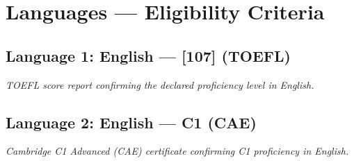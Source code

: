 \documentclass[12pt,a4paper]{article}
\newcommand{\insertdoc}[2]{%
  \begin{tcolorbox}[placeholderbox, title={$\Rightarrow$ #1}]
    \small\textit{#2}
  \end{tcolorbox}
  \vspace{4pt}
}
\begin{document}
\newpage
 
\section{Languages — Eligibility Criteria}
 
\subsection{Language 1: English — [107] (TOEFL)}
 
\insertdoc{TOEFL Certificate — English}{
  TOEFL score report confirming the declared proficiency level in English.
}

 
\subsection{Language 2: English — C1 (CAE)}
 
\insertdoc{CAE Certificate — English, C1}{
  Cambridge C1 Advanced (CAE) certificate confirming C1 proficiency in English.
}

 
\end{document}
